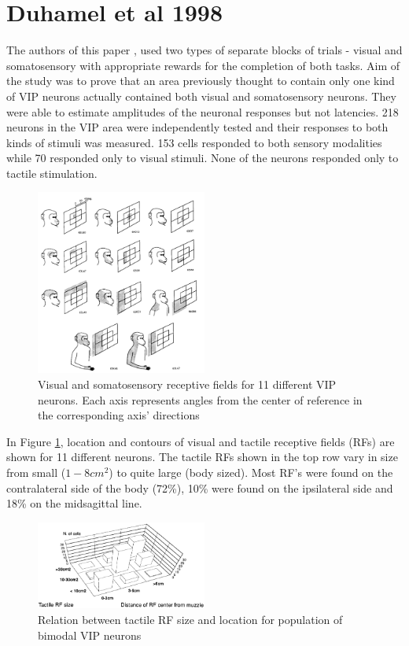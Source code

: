 \documentclass[10pt,oneside,final]{article}
\begin{document}
    \section{Duhamel et al 1998}
        The authors of this paper \cite{Duhamel1998}, used two types of separate blocks of trials - visual and somatosensory with appropriate rewards for the completion of both tasks. Aim of the study was to prove that an area previously thought to contain only one kind of VIP neurons actually contained both visual and somatosensory neurons. They were able to estimate amplitudes of the neuronal responses but not latencies. 218 neurons in the VIP area were independently tested and their responses to both kinds of stimuli was measured. 153 cells responded to both sensory modalities while 70 responded only to visual stimuli. None of the neurons responded only to tactile stimulation.
        \begin{figure}[h!]
            \centering
            \includegraphics[width=0.5\textwidth]{duhamel_bimodal_rf.png}
            \caption{Visual and somatosensory receptive fields for 11 different VIP neurons. Each axis represents angles from the center of reference in the corresponding axis' directions\cite{Duhamel1998}}
            \label{fig:duh_rf}
        \end{figure}
        In Figure \ref{fig:duh_rf}, location and contours of visual and tactile receptive fields (RFs) are shown for 11 different neurons. The tactile RFs shown in the top row vary in size from small ($1-8 cm^2$) to quite large (body sized). Most RF's were found on the contralateral side of the body (72\%), 10\% were found on the ipsilateral side and 18\% on the midsagittal line.
        \begin{figure}[h!]
            \centering
            \includegraphics[width=0.5\textwidth]{duhamel_RF_sizes.png}
            \caption{Relation between tactile RF size and location for population of bimodal VIP neurons \cite{Duhamel1998}}
            \label{fig:duf_rf_sizes}
        \end{figure}
\end{document}
